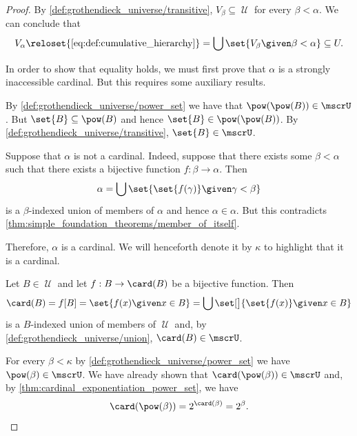 \begin{proof}
   By \ref{def:grothendieck_universe/transitive}, \( V_\beta \subseteq \mscrU \) for every \( \beta < \alpha \). We can conclude that
  \begin{equation*}
    V_\alpha
    \reloset {\eqref{eq:def:cumulative_hierarchy}} =
    \bigcup\set{ V_\beta \given \beta < \alpha }
    \subseteq
    U.
  \end{equation*}

  In order to show that equality holds, we must first prove that \( \alpha \) is a strongly inaccessible cardinal. But this requires some auxiliary results.

   By \ref{def:grothendieck_universe/power_set} we have that \( \pow(\pow(B)) \in \mscrU \). But \( \set{ B } \subseteq \pow(B) \) and hence \( \set{ B } \in \pow(\pow(B)) \). By \ref{def:grothendieck_universe/transitive}, \( \set{ B } \in \mscrU \).

   Suppose that \( \alpha \) is not a cardinal. Indeed, suppose that there exists some \( \beta < \alpha \) such that there exists a bijective function \( f: \beta \to \alpha \). Then
  \begin{equation*}
    \alpha = \bigcup\set{ \set{ f(\gamma) } \given \gamma < \beta }
  \end{equation*}
  is a \( \beta \)-indexed union of members of \( \alpha \) and hence \( \alpha \in \alpha \). But this contradicts \cref{thm:simple_foundation_theorems/member_of_itself}.

  Therefore, \( \alpha \) is a cardinal. We will henceforth denote it by \( \kappa \) to highlight that it is a cardinal.

   Let \( B \in \mscrU \) and let \( f: B \to \card(B) \) be a bijective function. Then
  \begin{equation*}
    \card(B)
    =
    f[B]
    =
    \set{ f(x) \given x \in B }
    =
    \bigcup\set[\big]{ \set{ f(x) } \given x \in B }
  \end{equation*}
   is a \( B \)-indexed union of members of \( \mscrU \) and, by \ref{def:grothendieck_universe/union}, \( \card(B) \in \mscrU \).

   For every \( \beta < \kappa \) by \ref{def:grothendieck_universe/power_set} we have \( \pow(\beta) \in \mscrU \). We have already shown that \( \card(\pow(\beta)) \in \mscrU \) and, by \cref{thm:cardinal_exponentiation_power_set}, we have
  \begin{equation*}
    \card(\pow(\beta)) = 2^{\card(\beta)} = 2^\beta.
  \end{equation*}


\end{proof}
